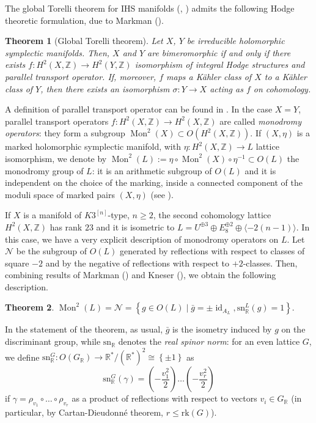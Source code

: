 \documentclass{amsart}
\newtheorem{theorem}{Theorem}[section]
\theoremstyle{definition}
\newcommand{\ra}{\rightarrow}
\newcommand{\IZ}{\mathbb{Z}}
\newcommand{\coloneqq}{:=}
\newcommand{\rk}{\mathrm{rk}}
\newcommand{\spinn}{\mathrm{sn}_{\mathbb{R}}}
\newcommand{\hskn}{K3^{\left[n\right]}}
\DeclareMathOperator{\id}{id}
\DeclareMathOperator{\Mo}{Mon}
\begin{document}
The global Torelli theorem for IHS manifolds (\cite{huybr_torelli}, \cite{verb}) admits the following Hodge theoretic formulation, due to Markman (\cite[Theorem 1.3]{markman}).
 
\begin{theorem}[Global Torelli theorem] \label{torelli}
Let $X$, $Y$ be irreducible holomorphic symplectic manifolds. Then, $X$ and $Y$ are bimeromorphic if and only if there exists $f: H^2(X,\IZ) \ra H^2(Y,\IZ)$ isomorphism of integral Hodge structures and parallel transport operator. If, moreover, $f$ maps a K\"ahler class of $X$ to a K\"ahler class of $Y$, then there exists an isomorphism $\sigma:Y \ra X$ acting as $f$ on cohomology.
\end{theorem}

A definition of parallel transport operator can be found in \cite[Definition 1.1]{markman}. In the case $X=Y$, parallel transport operators $f: H^2(X,\IZ) \ra H^2(X,\IZ)$ are called \emph{monodromy operators}: they form a subgroup $\Mo^2(X) \subset O(H^2(X,\IZ))$. If $(X, \eta)$ is a marked holomorphic symplectic manifold, with $\eta: H^2(X,\IZ) \ra L$ lattice isomorphism, we denote by $\Mo^2(L) \coloneqq \eta \circ \Mo^2(X) \circ \eta^{-1} \subset O(L)$ the monodromy group of $L$: it is an arithmetic subgroup of $O(L)$ and it is independent on the choice of the marking, inside a connected component of the moduli space of marked pairs $(X, \eta)$ (see \cite[\S 9]{markman}).

If $X$ is a manifold of $\hskn$-type, $n \geq 2$, the second cohomology lattice $H^2(X, \IZ)$ has rank $23$ and it is isometric to $L = U^{\oplus 3}\oplus E_8^{\oplus 2} \oplus \langle-2(n-1)\rangle$. In this case, we have a very explicit description of monodromy operators on $L$. Let $\mathcal{N}$ be the subgroup of $O(L)$ generated by reflections with respect to classes of square $-2$ and by the negative of reflections with respect to $+2$-classes. Then, combining results of Markman (\cite[Theorem 1.2]{markman2}) and Kneser (\cite{kneser}), we obtain the following description.

\begin{theorem} \label{monodromy group} $\Mo^2(L) = \mathcal{N} = \left\{ g \in O(L) \mid \bar{g} = \pm \id_{A_L}, \spinn^L(g) = 1 \right\}.$
\end{theorem}

In the statement of the theorem, as usual, $\bar{g}$ is the isometry induced by $g$ on the discriminant group, while $\spinn$ denotes the \emph{real spinor norm}: for an even lattice $G$, we define $\spinn^G: O(G_\mathbb{R}) \ra \mathbb{R}^*/\left(\mathbb{R}^*\right)^2 \cong \left\{ \pm 1\right\}$ as
 \[ \spinn^G(\gamma) = \left( -\frac{v_1^2}{2}\right) \ldots \left( -\frac{v_r^2}{2}\right)\]
 \noindent if $\gamma = \rho_{v_1} \circ \ldots \circ \rho_{v_r}$ as a product of reflections with respect to vectors $v_i \in G_\mathbb{R}$ (in particular, by Cartan-Dieudonn\'e theorem, $r \leq \rk(G)$).
\end{document}
